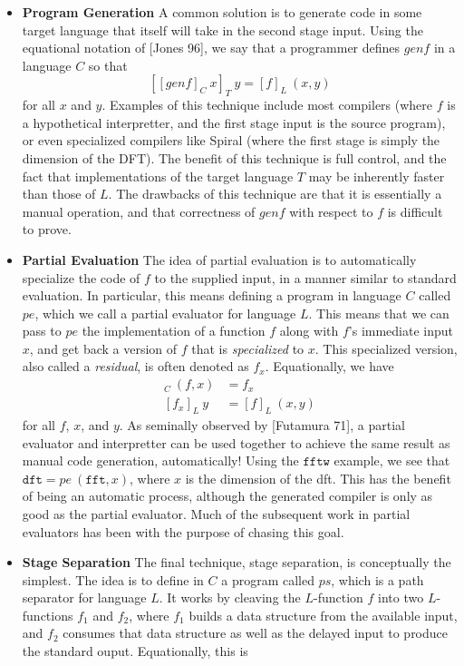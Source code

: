 \documentclass{article}
\begin{document}
\begin{itemize}
\item {\bf Program Generation} A common solution is to generate code in some target language that itself will take in the second stage input.  Using the equational notation of [Jones 96], we say that a programmer defines $\mathit{genf}$ in a language $C$ so that \[[[\mathit{genf}]_C~x]_T~y = [f]_L~(x,y)\] for all $x$ and $y$. Examples of this technique include most compilers (where $f$ is a hypothetical interpretter, and the first stage input is the source program), or even specialized compilers like Spiral (where the first stage is simply the dimension of the DFT).  The benefit of this technique is full control, and the fact that implementations of the target language $T$ may be inherently faster than those of $L$.  The drawbacks of this technique are that it is essentially a manual operation, and that correctness of $\mathit{genf}$ with respect to $\mathit{f}$ is difficult to prove.
\item {\bf Partial Evaluation} The idea of partial evaluation is to automatically specialize the code of $f$ to the supplied input, in a manner similar to standard evaluation.  In particular, this means defining a program in language $C$ called $pe$, which we call a partial evaluator for language $L$.  This means that we can pass to $pe$ the implementation of a function $f$ along with $f$'s immediate input $x$, and get back a version of $f$ that is {\em specialized} to $x$.  This specialized version, also called a {\em residual}, is often denoted as $f_x$.  Equationally, we have
\begin{align*}
[pe]_C~(f,x) &= f_x \\
[f_x]_L~y &= [f]_L~(x,y)
\end{align*}
 for all $f$, $x$, and $y$.  As seminally observed by [Futamura 71], a partial evaluator and interpretter can be used together to achieve the same result as manual code generation, automatically!  Using the $\mathtt{fftw}$ example, we see that $\mathtt{dft} = pe~(\mathtt{fft},x)$, where $x$ is the dimension of the dft.  This has the benefit of being an automatic process, although the generated compiler is only as good as the partial evaluator.  Much of the subsequent work in partial evaluators has been with the purpose of chasing this goal.
\item {\bf Stage Separation} The final technique, stage separation, is conceptually the simplest.  The idea is to define in $C$ a program called $ps$, which is a path separator for language $L$. It works by cleaving the $L$-function $f$ into two $L$-functions $f_1$ and $f_2$, where $f_1$ builds a data structure from the available input, and $f_2$ consumes that data structure as well as the delayed input to produce the standard ouput.  Equationally, this is

\end{itemize}
\end{document}
